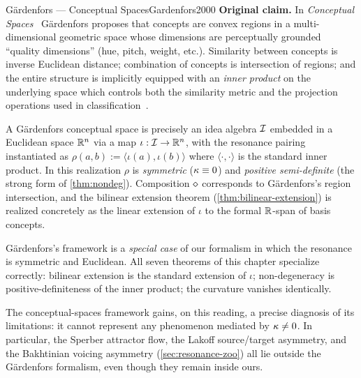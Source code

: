 \begin{zooentry}{G\"ardenfors --- Conceptual Spaces}{Gardenfors2000}
\textbf{Original claim.} In \emph{Conceptual Spaces}~\cite{Gardenfors2000}
G\"ardenfors proposes that concepts are convex regions in a multi-dimensional
geometric space whose dimensions are perceptually grounded ``quality
dimensions'' (hue, pitch, weight, etc.). Similarity between concepts is
inverse Euclidean distance; combination of concepts is intersection of
regions; and the entire structure is implicitly equipped with an
\emph{inner product} on the underlying space which controls both the
similarity metric and the projection operations used in
classification~\cite{Gardenfors2000}.

\formalclaim
A G\"ardenfors conceptual space is precisely an idea algebra
$\mathcal{I}$ embedded in a Euclidean space $\mathbb{R}^n$ via a map
$\iota:\mathcal{I}\to\mathbb{R}^n$, with the resonance pairing instantiated as
$\rho(a,b):=\langle\iota(a),\iota(b)\rangle$ where $\langle\cdot,\cdot\rangle$
is the standard inner product. In this realization $\rho$ is
\emph{symmetric} ($\kappa\equiv 0$) and \emph{positive semi-definite}
(the strong form of \cref{thm:nondeg}). Composition $\mathbin{\diamond}$ corresponds
to G\"ardenfors's region intersection, and the bilinear extension theorem
(\cref{thm:bilinear-extension}) is realized concretely as the linear
extension of $\iota$ to the formal $\mathbb{R}$-span of basis concepts.

\formalstatus
G\"ardenfors's framework is a \emph{special case} of our formalism in
which the resonance is symmetric and Euclidean. All seven theorems of
this chapter specialize correctly: bilinear extension is the standard
extension of $\iota$; non-degeneracy is positive-definiteness of the
inner product; the curvature vanishes identically.

\litcomment
The conceptual-spaces framework gains, on this reading, a precise
diagnosis of its limitations: it cannot represent any phenomenon
mediated by $\kappa\ne 0$. In particular, the Sperber attractor flow,
the Lakoff source/target asymmetry, and the Bakhtinian voicing
asymmetry (\cref{sec:resonance-zoo}) all lie outside the G\"ardenfors
formalism, even though they remain inside ours.
\end{zooentry}

